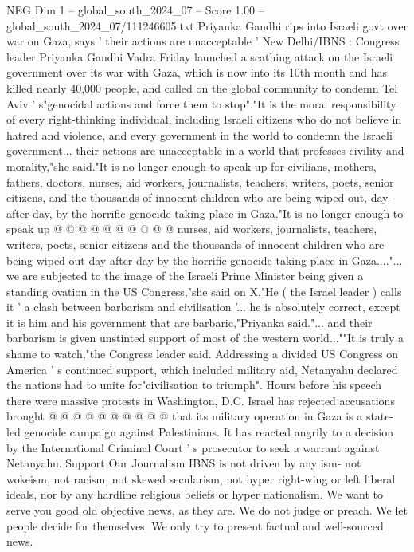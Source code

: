 \begin{textsample}{NEG Dim 1 – global\_south\_2024\_07 – Score 1.00 – global\_south\_2024\_07/111246605.txt}  \label{ex:f1_neg_393}
Priyanka Gandhi rips into Israeli govt over war on Gaza, says ' their actions are unacceptable ' New Delhi/IBNS : Congress leader Priyanka Gandhi Vadra Friday launched a scathing attack on the Israeli government over its war with Gaza, which is now into its 10th month and has killed nearly 40,000 people, and called on the global community to condemn Tel Aviv ' s"genocidal actions and force them to stop"."It is the moral responsibility of every right-thinking individual, including Israeli citizens who do not believe in hatred and violence, and every government in the world to condemn the Israeli government... their actions are unacceptable in a world that professes civility and morality,"she said."It is no longer enough to speak up for civilians, mothers, fathers, doctors, nurses, aid workers, journalists, teachers, writers, poets, senior citizens, and the thousands of innocent children who are being wiped out, day-after-day, by the horrific genocide taking place in Gaza."It is no longer enough to speak up @ @ @ @ @ @ @ @ @ @ nurses, aid workers, journalists, teachers, writers, poets, senior citizens and the thousands of innocent children who are being wiped out day after day by the horrific genocide taking place in Gaza...."... we are subjected to the image of the Israeli Prime Minister being given a standing ovation in the US Congress,"she said on X,"He ( the Israel leader ) calls it ' a clash between barbarism and civilisation '... he is absolutely correct, except it is him and his government that are barbaric,"Priyanka said."... and their barbarism is given unstinted support of most of the western world...""It is truly a shame to watch,"the Congress leader said.
Addressing a divided US Congress on America ' s continued support, which included military aid, Netanyahu declared the nations had to unite for"civilisation to triumph".
Hours before his speech there were massive protests in Washington, D.C.
Israel has rejected accusations brought @ @ @ @ @ @ @ @ @ @ that its military operation in Gaza is a state-led genocide campaign against Palestinians.
It has reacted angrily to a decision by the International Criminal Court ' s prosecutor to seek a warrant against Netanyahu.
Support Our Journalism IBNS is not driven by any ism- not wokeism, not racism, not skewed secularism, not hyper right-wing or left liberal ideals, nor by any hardline religious beliefs or hyper nationalism.
We want to serve you good old objective news, as they are.
We do not judge or preach.
We let people decide for themselves.
We only try to present factual and well-sourced news.

\end{textsample}
